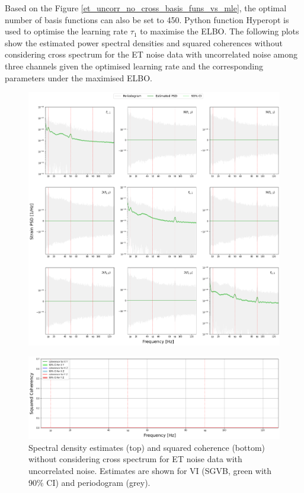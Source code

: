 \documentclass[%
 reprint,
 amsmath,amssymb,
 aps,
]{revtex4-2}
\begin{document}
Based on the Figure \ref {et_uncorr_no_cross_basis_funs_vs_mle}, the optimal number of basis functions can also be set to 450. Python function Hyperopt is used to optimise the learning rate $\tau_1$ to maximise the ELBO. The following plots show the estimated power spectral densities and squared coherences without considering cross spectrum for the ET noise data with uncorrelated noise among three channels given the optimised learning rate and the corresponding parameters under the maximised ELBO.
\begin{figure}
\centering
  \includegraphics[width=15cm]{ET uncorr noise no cross psd.png}
\end{figure}

\begin{figure}
\centering
  \includegraphics[width=15cm]{ET uncorr noise no cross coh.png}
  \caption{Spectral density estimates (top) and squared coherence (bottom) without considering cross spectrum for ET noise data with uncorrelated noise. Estimates are shown for VI (SGVB, green with 90\% CI) and periodogram (grey).}
\end{figure}
\end{document}
